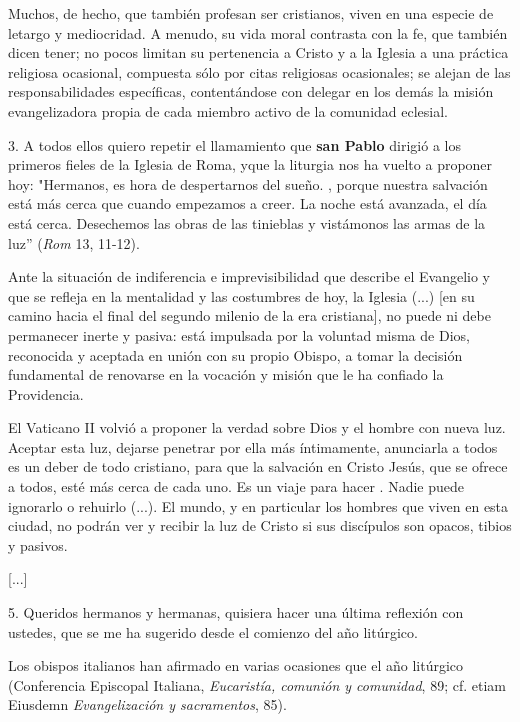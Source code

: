 \begin{body}
	Muchos, de hecho, que también profesan ser cristianos, viven en una especie de letargo y mediocridad. A menudo, su vida moral contrasta con la fe, que también dicen tener; no pocos limitan su pertenencia a Cristo y a la Iglesia a una práctica religiosa ocasional, compuesta sólo por citas religiosas ocasionales; se alejan de las responsabilidades específicas, contentándose con delegar en los demás la misión evangelizadora propia de cada miembro activo de la comunidad eclesial.
	
	3. A todos ellos quiero repetir el llamamiento que \textbf{san Pablo} dirigió a los primeros fieles de la Iglesia de Roma, y ​​que la liturgia nos ha vuelto a proponer hoy: "Hermanos, es hora de despertarnos del sueño. , porque nuestra salvación está más cerca que cuando empezamos a creer. La noche está avanzada, el día está cerca. Desechemos las obras de las tinieblas y vistámonos las armas de la luz'' (\emph{Rom} 13, 11-12).
	
	Ante la situación de indiferencia e imprevisibilidad que describe el Evangelio y que se refleja en la mentalidad y las costumbres de hoy, la Iglesia (...) {[}en su camino hacia el final del segundo milenio de la era cristiana{]}, no puede ni debe permanecer inerte y pasiva: está impulsada por la voluntad misma de Dios, reconocida y aceptada en unión con su propio Obispo, a tomar la decisión fundamental de renovarse en la vocación y misión que le ha confiado la Providencia.
	
	El Vaticano II volvió a proponer la verdad sobre Dios y el hombre con nueva luz. Aceptar esta luz, dejarse penetrar por ella más íntimamente, anunciarla a todos es un deber de todo cristiano, para que la salvación en Cristo Jesús, que se ofrece a todos, esté más cerca de cada uno. Es un viaje para hacer . Nadie puede ignorarlo o rehuirlo (...). El mundo, y en particular los hombres que viven en esta ciudad, no podrán ver y recibir la luz de Cristo si sus discípulos son opacos, tibios y pasivos.
	
	{[}...{]}
	
	5. Queridos hermanos y hermanas, quisiera hacer una última reflexión con ustedes, que se me ha sugerido desde el comienzo del año litúrgico.
	
	Los obispos italianos han afirmado en varias ocasiones que el año litúrgico  (Conferencia Episcopal Italiana, \emph{Eucaristía, comunión y comunidad}, 89; cf. etiam Eiusdemn \emph{Evangelización y sacramentos}, 85).
	

\end{body}
